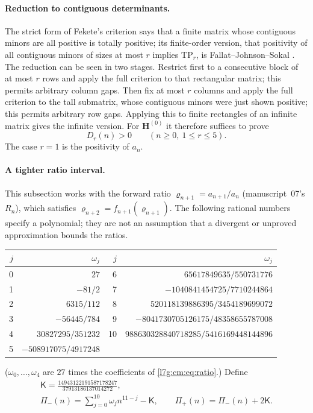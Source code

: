 \documentclass[11pt,letterpaper]{article}
\theoremstyle{remark}\newtheorem{remark}[theorem]{Remark}
\newcommand{\TP}{\mathrm{TP}}\newcommand{\TN}{\mathrm{TN}}
\newcounter{l7gtrsavedeq}
\begin{document}
\paragraph{Reduction to contiguous determinants.}
The strict form of Fekete's criterion says that a finite matrix whose
contiguous minors are all positive is totally positive; its finite-order
version, that positivity of all contiguous minors of sizes at most $r$
implies $\TP_r$, is Fallat--Johnson--Sokal \cite[Lemma~2.4]{l7g:hp:fjs}.
The reduction can be seen in two stages. Restrict first to a consecutive
block of at most $r$ rows and apply the full criterion to that rectangular
matrix; this permits arbitrary column gaps. Then fix at most $r$ columns
and apply the full criterion to the tall submatrix, whose contiguous minors
were just shown positive; this permits arbitrary row gaps. Applying this to
finite rectangles of an infinite matrix gives the infinite version. For
$\mathbf H^{(0)}$ it therefore suffices to prove
\begin{equation}\label{l7g:hp:eq:contiguousgoal}
 D_r(n)>0\qquad(n\ge0,\ 1\le r\le5).
\end{equation}
The case $r=1$ is the positivity of $a_n$.

\paragraph{A tighter ratio interval.}
This subsection works with the forward ratio $\varrho_{n+1}=a_{n+1}/a_n$
(manuscript~07's $R_n$), which satisfies $\varrho_{n+2}=f_{n+1}(\varrho_{n+1})$.
The following rational numbers specify a polynomial; they are not an
assumption that a divergent or unproved approximation bounds the ratios.
\begin{center}\small
\begin{tabular}{rr@{\qquad}rr}
\toprule
$j$ & $\omega_j$ & $j$ & $\omega_j$\\
\midrule
0 & $27$ & 6 & $65617849635/550731776$\\
1 & $-81/2$ & 7 & $-1040841454725/7710244864$\\
2 & $6315/112$ & 8 & $520118139886395/3454189699072$\\
3 & $-56445/784$ & 9 & $-8041730705126175/48358655787008$\\
4 & $30827295/351232$ & 10 & $988630328840718285/5416169448144896$\\
5 & $-508917075/4917248$ & &\\
\bottomrule
\end{tabular}
\end{center}
($\omega_0,\dots,\omega_4$ are $27$ times the coefficients of
\eqref{l7g:cm:eq:ratio}.) Define
\begin{gather}
 \mathsf K=\frac{14943122191587178247}{37913186137014272},\label{l7g:hp:eq:K}\\
 \Pi_-(n)=\sum_{j=0}^{10}\omega_jn^{11-j}-\mathsf K,\qquad
 \Pi_+(n)=\Pi_-(n)+2\mathsf K.\label{l7g:hp:eq:Pi}
\end{gather}
\end{document}
